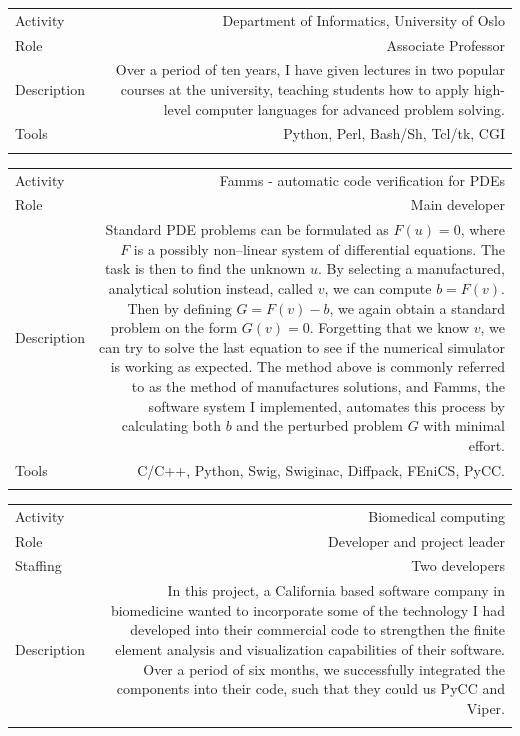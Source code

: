 \documentclass[english,a4paper,11pt]{article}
\begin{document}
\begin{tabular}{@{}LR}
Activity & Department of Informatics, University of Oslo\\
Role & Associate Professor\\
Description & Over a period of ten years, I have given lectures in two popular courses at the university, teaching students how to apply high-level computer languages for advanced problem solving.\\
Tools & Python, Perl, Bash/Sh, Tcl/tk, CGI\\ 
\addlinespace \bottomrule[.1pt] \addlinespace
   \end{tabular}

\begin{tabular}{@{}LR}
Activity & Famms - automatic code verification for PDEs\\
Role & Main developer\\
Description & Standard PDE problems can be formulated as $F(u)=0$, where $F$ is a possibly non--linear system of differential equations. The task is then to find the unknown $u$. By selecting a manufactured, analytical solution instead, called $v$, we can compute $b=F(v)$. Then by defining $G = F(v)-b$, we again obtain a standard problem on the form $G(v)=0$. Forgetting that we know $v$, we can try to solve the last equation to see if the numerical simulator is working as expected. The method above is commonly referred to as the method of manufactures solutions, and Famms, the software system I implemented, automates this process by calculating both $b$ and the perturbed problem $G$ with minimal effort.\\
Tools & C/C++, Python, Swig, Swiginac, Diffpack, FEniCS, PyCC.\\ 
\addlinespace \bottomrule[.1pt] \addlinespace
   \end{tabular}

\begin{tabular}{@{}LR}
Activity & Biomedical computing\\
Role & Developer and project leader\\
Staffing & Two developers\\
Description & In this project, a California based software company in biomedicine wanted to incorporate some of the technology I had developed into their commercial code to strengthen the finite element analysis and visualization capabilities of their software. Over a period of six months, we successfully integrated the components into their code, such that they could us PyCC and Viper.\\ 
\addlinespace \bottomrule[.1pt] \addlinespace
   \end{tabular}
\end{document}
